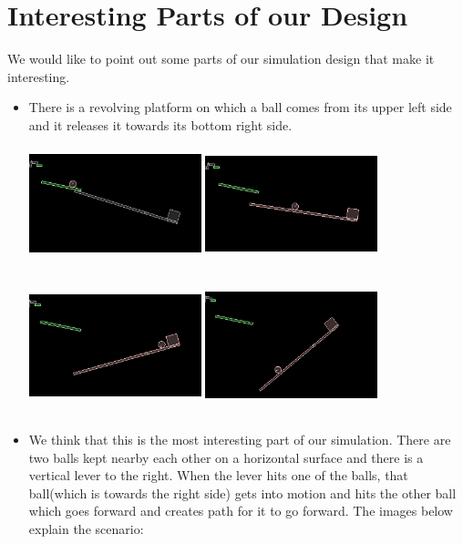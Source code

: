\documentclass[english]{article}
\begin{document}
\section{Interesting Parts of our Design}
We would like to point out some parts of our simulation design that make it interesting.
\begin{itemize}
\item There is a revolving platform on which a ball comes from its upper left side and it releases it towards its bottom right side.
\newline
\includegraphics[width=5cm, height=4cm]{doc/s1.png}
\includegraphics[width=5cm, height=4cm]{doc/s2.png}
\includegraphics[width=5cm, height=4cm]{doc/s3.png}
\includegraphics[width=5cm, height=4cm]{doc/s4.png}
\newline
\item We think that this is the most interesting part of our simulation. There are two balls kept nearby each other on a horizontal surface and there is a vertical lever to the right. When the lever hits one of the balls, that ball(which is towards the right side) gets into motion and hits the other ball which goes forward and creates path for it to go forward. The images below explain the scenario:

\end{itemize}
\end{document}
